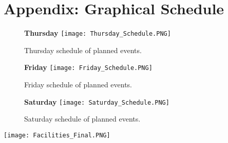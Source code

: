 \section{Appendix: Graphical Schedule}
\label{appendix:schedule}
\begin{figure}[H]
	\Large\textbf{Thursday}
	\centering
	\texttt{[image: Thursday\_Schedule.PNG]}
	\caption{Thursday schedule of planned events.}
\end{figure}
\begin{figure}[H]
	\Large\textbf{Friday}
	\centering
	\texttt{[image: Friday\_Schedule.PNG]}
	\caption{Friday schedule of planned events.}
\end{figure}
\begin{figure}[H]
	\Large\textbf{Saturday}
	\centering
	\texttt{[image: Saturday\_Schedule.PNG]}
	\caption{Saturday schedule of planned events.}
\end{figure}

\newpage
\begin{landscape}
	\centering
	{\texttt{[image: Facilities\_Final.PNG]}}
\end{landscape}